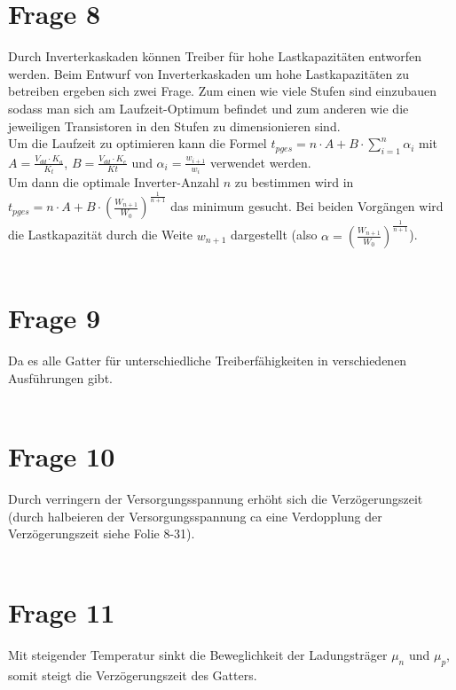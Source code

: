 \documentclass[a4paper]{scrartcl}
\begin{document}
\section*{Frage 8}
Durch Inverterkaskaden können Treiber für hohe Lastkapazitäten entworfen werden. Beim Entwurf von Inverterkaskaden um hohe Lastkapazitäten zu betreiben ergeben sich zwei Frage. Zum einen wie viele Stufen sind einzubauen sodass man sich am Laufzeit-Optimum befindet und zum anderen wie die jeweiligen Transistoren in den Stufen zu dimensionieren sind.\\
Um die Laufzeit zu optimieren kann die Formel $t_{pges} = n \cdot A + B \cdot \sum_{i=1}^n \alpha_i$ mit $A = \frac{V_{dd} \cdot K_a}{K_t}$, $B = \frac{V_{dd} \cdot K_e}{Kt}$ und $\alpha_i = \frac{w_{i+1}}{w_i}$ verwendet werden.\\
Um dann die optimale Inverter-Anzahl $n$ zu bestimmen wird in $t_{pges} = n \cdot A + B \cdot (\frac{W_{n+1}}{W_0})^{\frac{1}{n+1}} $ das minimum gesucht.
Bei beiden Vorgängen wird die Lastkapazität durch die Weite $w_{n+1}$ dargestellt (also $\alpha = (\frac{W_{n+1}}{W_0})^{\frac{1}{n+1}}$).
~\\
~\\
\section*{Frage 9}
Da es alle Gatter für unterschiedliche Treiberfähigkeiten in verschiedenen Ausführungen gibt.
~\\
~\\
\section*{Frage 10}
Durch verringern der Versorgungsspannung erhöht sich die Verzögerungszeit (durch halbeieren der Versorgungsspannung ca eine Verdopplung der Verzögerungszeit siehe Folie 8-31).
~\\
~\\
\section*{Frage 11}
Mit steigender Temperatur sinkt die Beweglichkeit der Ladungsträger $\mu_n$ und $\mu_p$, somit steigt die Verzögerungszeit des Gatters.
~\\
~\\
\end{document}
